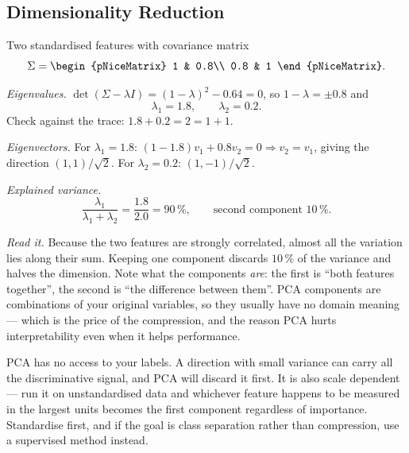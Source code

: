 \subsection{Dimensionality Reduction}

\begin{workedexample}
Two standardised features with covariance matrix
\[
  \Sigma = \begin{pNiceMatrix} 1 & 0.8\\ 0.8 & 1 \end{pNiceMatrix}.
\]

\emph{Eigenvalues.} $\det(\Sigma-\lambda I) = (1-\lambda)^2 - 0.64 = 0$, so
$1-\lambda = \pm0.8$ and
\[
  \lambda_1 = 1.8,\qquad \lambda_2 = 0.2 .
\]
Check against the trace: $1.8+0.2 = 2 = 1+1$. \checkmark

\emph{Eigenvectors.} For $\lambda_1 = 1.8$: $(1-1.8)v_1 + 0.8v_2 = 0
\Rightarrow v_2 = v_1$, giving the direction $(1,1)/\sqrt2$. For
$\lambda_2 = 0.2$: $(1,-1)/\sqrt2$.

\emph{Explained variance.}
\[
  \frac{\lambda_1}{\lambda_1+\lambda_2} = \frac{1.8}{2.0} = 90\,\% ,
  \qquad \text{second component } 10\,\% .
\]

\emph{Read it.} Because the two features are strongly correlated, almost all
the variation lies along their sum. Keeping one component discards $10\,\%$ of
the variance and halves the dimension. Note what the components \emph{are}: the
first is ``both features together'', the second is ``the difference between
them''. PCA components are combinations of your original variables, so they
usually have no domain meaning --- which is the price of the compression, and
the reason PCA hurts interpretability even when it helps performance.
\end{workedexample}

\begin{cautionbox}
PCA has no access to your labels. A direction with small variance can carry all
the discriminative signal, and PCA will discard it first. It is also scale
dependent --- run it on unstandardised data and whichever feature happens to be
measured in the largest units becomes the first component regardless of
importance. Standardise first, and if the goal is class separation rather than
compression, use a supervised method instead.
\end{cautionbox}

